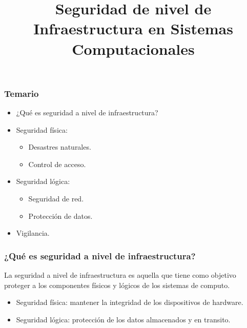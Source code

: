 \documentclass[11pt,a4paper,spanish]{beamer}
\title{Seguridad de nivel de Infraestructura en Sistemas Computacionales}
\author{}
\date{}
\begin{document}
\begin{frame}[noframenumbering]


    \maketitle
    \centering

\end{frame}

\begin{frame}

    \frametitle{Temario}

\begin{itemize}

    \item ¿Qué es seguridad a nivel de infraestructura?
    \item Seguridad física: 
    \begin{itemize}
        \item Desastres naturales.
        \item Control de acceso.
    \end{itemize}
    \item Seguridad lógica:
    \begin{itemize}
        \item Seguridad de red.
        \item Protección de datos.
    \end{itemize}
    \item Vigilancia.

\end{itemize}
\end{frame}

\begin{frame}
    \frametitle{¿Qué es seguridad a nivel de infraestructura?}

    La seguridad a nivel de infraestructura es aquella que tiene como objetivo
    proteger a los componentes físicos y lógicos de los sistemas de
    computo.

    \begin{itemize}
        \item Seguridad física: mantener la integridad de los dispositivos de
            hardware.
        \item Seguridad lógica: protección de los datos almacenados y en
            transito.
    \end{itemize}
\end{frame}
\end{document}
